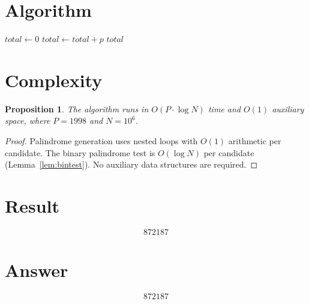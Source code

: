 \documentclass[12pt]{article}
\newtheorem{proposition}[theorem]{Proposition}
\theoremstyle{definition}
\begin{document}
\section{Algorithm}

\begin{algorithmic}[1]
    \State $\mathit{total} \gets 0$
                \State $\mathit{total} \gets \mathit{total} + p$
            \EndIf
        \EndFor
    \EndFor
    \State \Return $\mathit{total}$
\EndFunction
\end{algorithmic}

\section{Complexity}

\begin{proposition}
The algorithm runs in $O(P \cdot \log N)$ time and $O(1)$ auxiliary space, where $P = 1998$ and $N = 10^6$.
\end{proposition}
\begin{proof}
Palindrome generation uses nested loops with $O(1)$ arithmetic per candidate. The binary palindrome test is $O(\log N)$ per candidate (Lemma~\ref{lem:bintest}). No auxiliary data structures are required.
\end{proof}

\section{Result}
\[
    \boxed{872187}
\]

\section{Answer}

\[
\boxed{872187}
\]
\end{document}

